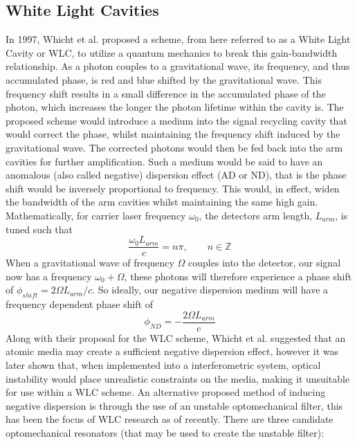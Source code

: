 \documentclass[aps,
                pra,  
                a4paper, 
                amsmath, 
                amssymb, 
                preprint,
                amsfonts,
                nofootinbib,
                titlepage
            ]{revtex4-2}
\begin{document}
    \subsection{White Light Cavities}
    In 1997, Whicht et al. proposed a scheme, from here referred to as a White Light Cavity or WLC, to utilize a quantum mechanics to break this gain-bandwidth relationship. As a photon couples to a gravitational wave, its frequency, and thus accumulated phase, is red and blue shifted by the gravitational wave. This frequency shift results in a small difference in the accumulated phase of the photon, which increases the longer the photon lifetime within the cavity is. The proposed scheme would introduce a medium into the signal recycling cavity that would correct the phase, whilst maintaining the frequency shift induced by the gravitational wave. The corrected photons would then be fed back into the arm cavities for further amplification. Such a medium would be said to have an anomalous (also called negative) dispersion effect (AD or ND), that is the phase shift would be inversely proportional to frequency. This would, in effect, widen the bandwidth of the arm cavities whilst maintaining the same high gain. Mathematically, for carrier laser frequency $\omega_0$, the detectors arm length, $L_{arm}$, is tuned such that
    \begin{equation}
        \label{eq:cavity-resonance-condition}
        \frac{\omega_0L_{arm}}{c} = n\pi, \qquad n\in\mathbb{Z}
    \end{equation}
    When a gravitational wave of frequency $\Omega$ couples into the detector, our signal now has a frequency $\omega_0+\Omega$, these photons will therefore experience a phase shift of $\phi_{shift}=2\Omega L_{arm}/c$. So ideally, our negative dispersion medium will have a frequency dependent phase shift of
    \begin{equation}
        \label{eq:phase-correction}
        \phi_{ND} = -\frac{2\Omega L_{arm}}{c}
    \end{equation}
    Along with their proposal for the WLC scheme, Whicht et al. suggested that an atomic media may create a sufficient negative dispersion effect, however it was later shown that, when implemented into a interferometric system, optical instability would place unrealistic constraints on the media, making it unsuitable for use within a WLC scheme. An alternative proposed method of inducing negative dispersion is through the use of an unstable optomechanical filter, this has been the focus of WLC research as of recently. There are three candidate optomechanical resonators (that may be used to create the unstable filter):
\end{document}
